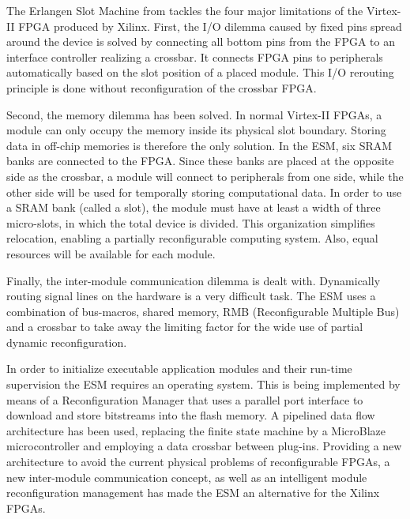 
The Erlangen Slot Machine from \cite{erlangen} tackles the four major limitations of the Virtex-II FPGA produced by Xilinx. First, the I/O dilemma caused by fixed pins spread around the device is solved by connecting all bottom pins from the FPGA to an interface controller realizing a crossbar. It connects FPGA pins to peripherals automatically based on the slot position of a placed module. This I/O rerouting principle is done without reconfiguration of the crossbar FPGA.

Second, the memory dilemma has been solved. In normal Virtex-II FPGAs, a module can only occupy the memory inside its physical slot boundary. Storing data in off-chip memories is therefore the only solution. In the ESM, six SRAM banks are connected to the FPGA. Since these banks are placed at the opposite side as the crossbar, a module will connect to peripherals from one side, while the other side will be used for temporally storing computational data. In order to use a SRAM bank (called a slot), the module must have at least a width of three micro-slots, in which the total device is divided. This organization simplifies relocation, enabling a partially reconfigurable computing system. Also, equal resources will be available for each module.

Finally, the inter-module communication dilemma is dealt with. Dynamically routing signal lines on the hardware is a very difficult task. The ESM uses a combination of bus-macros, shared memory, RMB (Reconfigurable Multiple Bus) and a crossbar to take away the limiting factor for the wide use of partial dynamic reconfiguration.

In order to initialize executable application modules and their run-time supervision the ESM requires an operating system. This is being implemented by means of a Reconfiguration Manager that uses a parallel port interface to download and store bitstreams into the flash memory. A pipelined data flow architecture has been used, replacing the finite state machine by a MicroBlaze microcontroller and employing a data crossbar between plug-ins. Providing  a new architecture to avoid the current physical problems of reconfigurable FPGAs, a new inter-module communication concept, as well as an intelligent module reconfiguration management has made the ESM an alternative for the Xilinx FPGAs.
